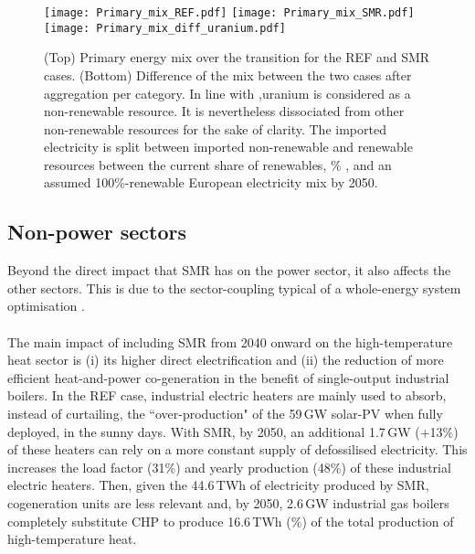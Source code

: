 \begin{figure}[htbp!]
\centering
\texttt{[image: Primary\_mix\_REF.pdf]}
\texttt{[image: Primary\_mix\_SMR.pdf]}
\texttt{[image: Primary\_mix\_diff\_uranium.pdf]}
\caption{(Top) Primary energy mix over the transition for the REF and SMR cases. (Bottom) Difference of the mix between the two cases after aggregation per category. In line with \citet{rixhon2021terminology},uranium is considered as a non-renewable resource. It is nevertheless dissociated from other non-renewable resources for the sake of clarity. The imported electricity is split between imported non-renewable and renewable resources between the current share of renewables, \% \cite{eurostat_share_re_elec}, and an assumed 100\%-renewable European electricity mix by 2050.}
\label{fig:results_deter_energy_mix}
\end{figure}

\newpage
\subsection{Non-power sectors}
\label{subsec:atom_mol:results_deter_others}

Beyond the direct impact that \gls{SMR} has on the power sector, it also affects the other sectors. This is due to the sector-coupling typical of a whole-energy system optimisation \cite{contino2020whole}.\\

\\

The main impact of including \gls{SMR} from 2040 onward on the high-temperature heat sector is (i) its higher direct electrification and (ii) the reduction of more efficient heat-and-power co-generation in the benefit of single-output industrial boilers. In the REF case, industrial electric heaters are mainly used to absorb, instead of curtailing, the ``over-production" of the 59\,GW solar-PV when fully deployed, in the sunny days. With \gls{SMR}, by 2050, an additional 1.7\,GW (+13\%) of these heaters can rely on a more constant supply of defossilised electricity. This increases the load factor (31\%) and yearly production (48\%) of these industrial electric heaters. Then, given the 44.6\,TWh of electricity produced by \gls{SMR}, cogeneration units are less relevant and, by 2050, 2.6\,GW industrial gas boilers completely substitute \gls{CHP} to produce 16.6\,TWh (\%) of the total production of high-temperature heat.\\

